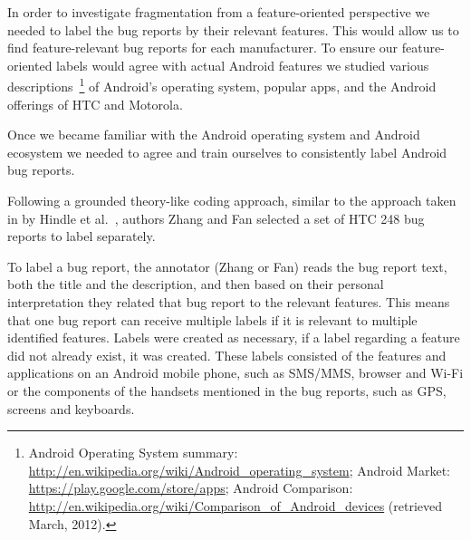 \documentclass[10pt, conference, compsocconf]{IEEEtran}
\begin{document}

In order to investigate fragmentation from a feature-oriented
perspective we needed to label the bug reports by their
relevant features. This would allow us to find feature-relevant bug reports
for each manufacturer.
To ensure our feature-oriented labels would agree with actual
Android features we studied various descriptions~\footnote{Android Operating System summary:
\url{http://en.wikipedia.org/wiki/Android_operating_system};
Android Market: \url{https://play.google.com/store/apps};
Android Comparison:
\url{http://en.wikipedia.org/wiki/Comparison_of_Android_devices}
(retrieved March, 2012).}
 of Android's
operating system, popular apps, and the Android offerings of HTC and
Motorola.



Once we became familiar with the Android operating system and Android
ecosystem we needed to agree and train ourselves to consistently label
Android bug reports.


Following a grounded theory-like coding approach, similar to the
approach taken in by Hindle et al.~\cite{Hindle2011}, authors Zhang
and Fan selected a set of HTC 248 bug reports to label
separately. 

To label a bug report, the annotator (Zhang or Fan) reads the bug
report text, both the title and the description, and  then based on their
personal interpretation they related that bug report to the relevant
features. This means that one bug report can receive multiple labels
if it is relevant to multiple identified features. Labels were created
as necessary, if a label regarding a feature did not already exist, it
was created.
These labels 
consisted of the features and applications on an Android mobile
phone, such as SMS/MMS, browser and Wi-Fi or the components of the
handsets mentioned in the bug reports, such as GPS, screens and
keyboards.
\end{document}
